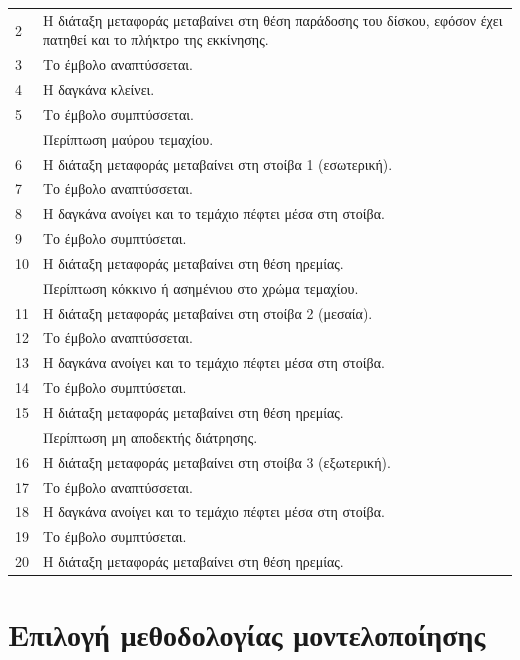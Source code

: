 \documentclass[a4paper,12pt,twoside]{report}
\begin{document}
{\begin{longtable} { m{0.5cm} m{12cm} }
					2 & Η διάταξη μεταφοράς μεταβαίνει στη θέση παράδοσης του δίσκου, εφόσον έχει πατηθεί και το πλήκτρο της εκκίνησης.\\
					3 & Το έμβολο αναπτύσσεται.\\
					4 & Η δαγκάνα κλείνει.\\
					5 & Το έμβολο συμπτύσσεται.\\
					   & Περίπτωση μαύρου τεμαχίου.\\
					6 & Η διάταξη μεταφοράς μεταβαίνει στη στοίβα 1 (εσωτερική).\\
					7 & Το έμβολο αναπτύσσεται.\\
					8 & Η δαγκάνα ανοίγει και το τεμάχιο πέφτει μέσα στη στοίβα.\\
					9 & Το έμβολο συμπτύσεται.\\
					10 & Η διάταξη μεταφοράς μεταβαίνει στη θέση ηρεμίας.\\
					    & Περίπτωση κόκκινο ή ασημένιου στο χρώμα τεμαχίου.\\
					11 & Η διάταξη μεταφοράς μεταβαίνει στη στοίβα 2 (μεσαία).\\
					12 & Το έμβολο αναπτύσσεται.\\
					13 & Η δαγκάνα ανοίγει και το τεμάχιο πέφτει μέσα στη στοίβα.\\
					14 & Το έμβολο συμπτύσεται.\\
					15 & Η διάταξη μεταφοράς μεταβαίνει στη θέση ηρεμίας.\\
					    & Περίπτωση μη αποδεκτής διάτρησης.\\
					16 & Η διάταξη μεταφοράς μεταβαίνει στη στοίβα 3 (εξωτερική).\\
					17 & Το έμβολο αναπτύσσεται.\\
					18 & Η δαγκάνα ανοίγει και το τεμάχιο πέφτει μέσα στη στοίβα.\\
					19 & Το έμβολο συμπτύσεται.\\
					20 & Η διάταξη μεταφοράς μεταβαίνει στη θέση ηρεμίας.\\
					\hline
				\end{longtable}
				
				
				
		\section{Επιλογή μεθοδολογίας μοντελοποίησης}

}
\end{document}
